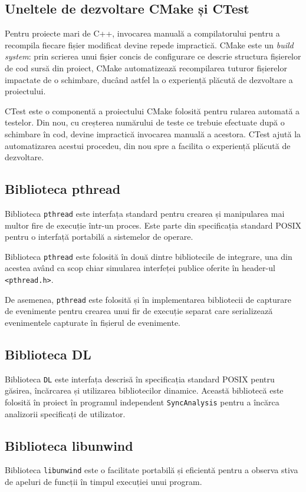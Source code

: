 \subsection{Uneltele de dezvoltare CMake și CTest}
Pentru proiecte mari de C++, invocarea manuală a compilatorului pentru
a recompila fiecare fișier modificat devine repede impractică.
CMake\cite{CMake} este un \textit{build system}: prin scrierea unui
fișier concis de configurare ce descrie structura fișierelor de cod
sursă din proiect, CMake automatizează recompilarea tuturor fișierelor
impactate de o schimbare, ducând astfel la o experiență plăcută de
dezvoltare a proiectului.

CTest este o componentă a proiectului CMake folosită pentru rularea
automată a testelor. Din nou, cu creșterea numărului de teste ce
trebuie efectuate după o schimbare în cod, devine impractică invocarea
manuală a acestora. CTest ajută la automatizarea acestui procedeu, din
nou spre a facilita o experiență plăcută de dezvoltare.

\subsection{Biblioteca pthread}
Biblioteca \lstinline{pthread}\cite{pthread} este interfața standard
pentru crearea și manipularea mai multor fire de execuție într-un
proces. Este parte din specificația standard POSIX pentru o interfață
portabilă a sistemelor de operare.

Biblioteca \lstinline{pthread} este folosită în două dintre bibliotecile
de integrare, una din acestea având ca scop chiar simularea interfeței
publice oferite în header-ul \lstinline{<pthread.h>}.

De asemenea, \lstinline{pthread} este folosită și în implementarea
bibliotecii de capturare de evenimente pentru crearea unui fir de
execuție separat care serializează evenimentele capturate în fișierul de
evenimente.

\subsection{Biblioteca DL}
Biblioteca \lstinline{DL}\cite{DL} este interfața descrisă în
specificația standard POSIX pentru găsirea, încărcarea și utilizarea
bibliotecilor dinamice. Această bibliotecă este folosită în proiect în
programul independent \lstinline{SyncAnalysis} pentru a încărca
analizorii specificați de utilizator.

\subsection{Biblioteca libunwind}
Biblioteca \lstinline{libunwind}\cite{libunwind} este o facilitate
portabilă și eficientă pentru a observa stiva de apeluri de funcții în
timpul execuției unui program.

